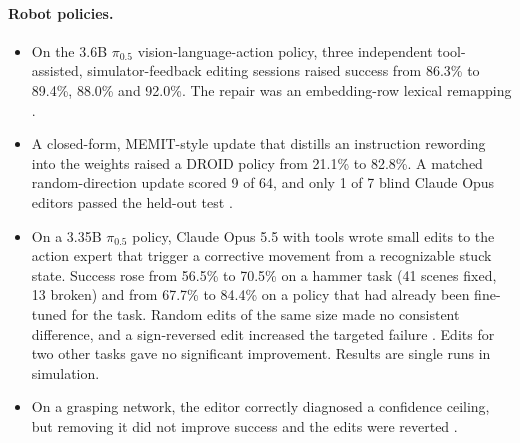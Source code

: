 \paragraph{Robot policies.}
\begin{itemize}[leftmargin=*,itemsep=2pt]
\item On the 3.6B $\pi_{0.5}$ vision-language-action policy, three independent tool-assisted, simulator-feedback editing sessions raised success from 86.3\% to 89.4\%, 88.0\% and 92.0\%. The repair was an embedding-row lexical remapping \citep{ax2611_09376}.
\item A closed-form, MEMIT-style update that distills an instruction rewording into the weights raised a DROID policy from 21.1\% to 82.8\%. A matched random-direction update scored 9 of 64, and only 1 of 7 blind Claude Opus editors passed the held-out test \citep{ax2611_11894}.
\item On a 3.35B $\pi_{0.5}$ policy, Claude Opus 5.5 with tools wrote small edits to the action expert that trigger a corrective movement from a recognizable stuck state. Success rose from 56.5\% to 70.5\% on a hammer task (41 scenes fixed, 13 broken) and from 67.7\% to 84.4\% on a policy that had already been fine-tuned for the task. Random edits of the same size made no consistent difference, and a sign-reversed edit increased the targeted failure \citep{ax2611_31715}. Edits for two other tasks gave no significant improvement. Results are single runs in simulation.
\item On a grasping network, the editor correctly diagnosed a confidence ceiling, but removing it did not improve success and the edits were reverted \citep{ax2611_18919}.
\end{itemize}

